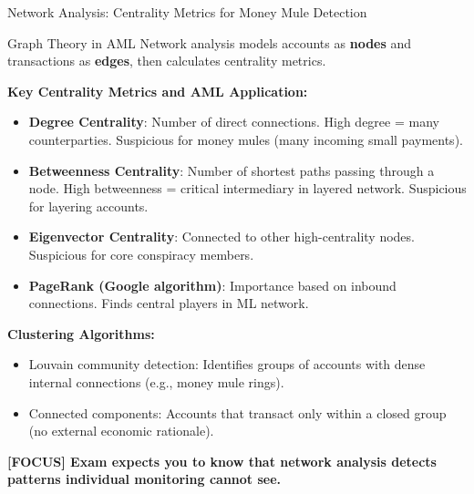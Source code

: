 \documentclass[11pt,a4paper]{beamer}
\newcommand{\examfocus}[1]{\textcolor{orange!80!black}{\textbf{[FOCUS] #1}}}
\begin{document}
\begin{frame}{Network Analysis: Centrality Metrics for Money Mule Detection}
	\begin{block}{Graph Theory in AML}
		Network analysis models accounts as \textbf{nodes} and transactions as \textbf{edges}, then calculates centrality metrics.
	\end{block}
	\textbf{Key Centrality Metrics and AML Application:}
	\begin{itemize}
		\item \textbf{Degree Centrality}: Number of direct connections. High degree = many counterparties. Suspicious for money mules (many incoming small payments).
		\item \textbf{Betweenness Centrality}: Number of shortest paths passing through a node. High betweenness = critical intermediary in layered network. Suspicious for layering accounts.
		\item \textbf{Eigenvector Centrality}: Connected to other high-centrality nodes. Suspicious for core conspiracy members.
		\item \textbf{PageRank (Google algorithm)}: Importance based on inbound connections. Finds central players in ML network.
	\end{itemize}
	\textbf{Clustering Algorithms:}
	\begin{itemize}
		\item Louvain community detection: Identifies groups of accounts with dense internal connections (e.g., money mule rings).
		\item Connected components: Accounts that transact only within a closed group (no external economic rationale).
	\end{itemize}
	\examfocus{Exam expects you to know that network analysis detects patterns individual monitoring cannot see.}
\end{frame}
\end{document}

